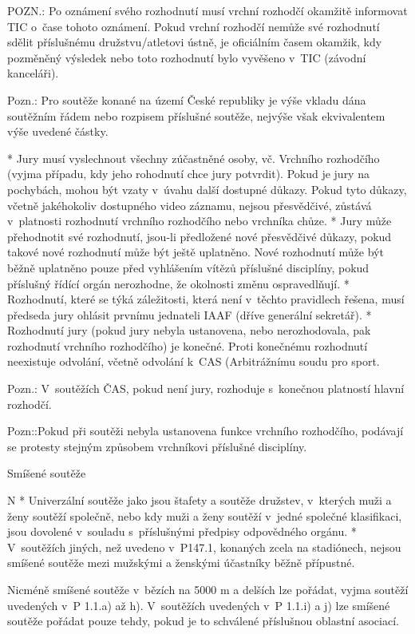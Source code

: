 POZN.: Po oznámení svého rozhodnutí musí vrchní rozhodčí okamžitě informovat TIC o~čase tohoto oznámení. Pokud vrchní rozhodčí nemůže své rozhodnutí sdělit příslušnému družstvu/atletovi ústně, je oficiálním časem okamžik, kdy pozměněný výsledek nebo  toto rozhodnutí bylo vyvěšeno v~TIC (závodní kanceláři).

Pozn.: Pro soutěže konané na území České republiky je výše vkladu dána soutěžním řádem nebo rozpisem příslušné soutěže, nejvýše však ekvivalentem výše uvedené částky.

* Jury musí vyslechnout všechny zúčastněné osoby, vč. Vrchního rozhodčího (vyjma případu, kdy jeho rohodnutí chce jury potvrdit). Pokud je jury na pochybách, mohou být vzaty v~úvahu další dostupné důkazy. Pokud tyto důkazy, včetně jakéhokoliv dostupného video záznamu, nejsou přesvědčivé, zůstává v~platnosti rozhodnutí vrchního rozhodčího nebo vrchníka chůze.
* Jury může přehodnotit své rozhodnutí, jsou-li předložené nové přesvědčivé důkazy, pokud takové nové rozhodnutí může být ještě uplatněno. Nové rozhodnutí může být běžně uplatněno pouze před vyhlášením vítězů příslušné disciplíny, pokud příslušný řídící orgán nerozhodne, že okolnosti změnu ospravedlňují.
* Rozhodnutí, které se týká záležitosti, která není v~těchto pravidlech řešena, musí předseda jury ohlásit prvnímu jednateli IAAF (dříve generální sekretář).
* Rozhodnutí jury (pokud jury nebyla ustanovena, nebo nerozhodovala, pak rozhodnutí vrchního rozhodčího) je konečné. Proti konečnému rozhodnutí neexistuje odvolání, včetně odvolání k~CAS (Arbitrážnímu soudu pro sport.

Pozn.: V~soutěžích ČAS, pokud není jury, rozhoduje s~konečnou platností hlavní rozhodčí.

Pozn::Pokud při soutěži nebyla ustanovena funkce vrchního rozhodčího, podávají se protesty stejným způsobem vrchníkovi příslušné disciplíny.
\enditems

\secc Smíšené soutěže

\begitems \style N
* Univerzální soutěže jako jsou štafety a soutěže družstev, v~kterých muži a ženy soutěží společně, nebo kdy muži a ženy soutěží v~jedné společné klasifikaci, jsou dovolené v~souladu s~příslušnými předpisy odpovědného orgánu.
* V~soutěžích jiných, než uvedeno v~P147.1, konaných zcela na stadiónech, nejsou smíšené soutěže mezi mužskými a ženskými účastníky běžně přípustné.

Nicméně smíšené soutěže v~bězích na 5000 m a delších lze pořádat, vyjma soutěží uvedených v~P 1.1.a) až h). V~soutěžích uvedených v~P 1.1.i) a j) lze smíšené soutěže pořádat pouze tehdy, pokud je to schválené příslušnou oblastní asociací.

